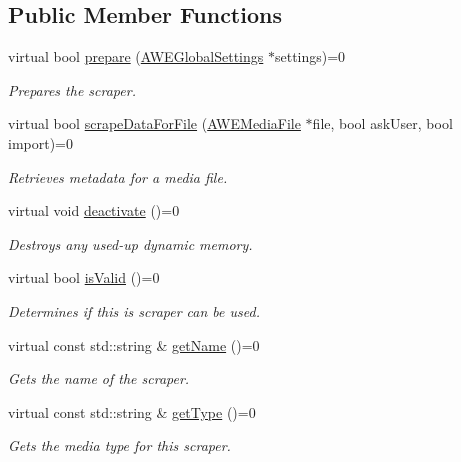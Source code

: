 \subsection*{Public Member Functions}
\begin{DoxyCompactItemize}
\item 
virtual bool \hyperlink{class_a_w_e_metadata_scraper_a7c4612f42582452206dc293f81c6e570}{prepare} (\hyperlink{class_a_w_e_global_settings}{A\-W\-E\-Global\-Settings} $\ast$settings)=0
\begin{DoxyCompactList}\small\item\em Prepares the scraper. \end{DoxyCompactList}\item 
virtual bool \hyperlink{class_a_w_e_metadata_scraper_a6e9431f049dc303983e7a279ed967bea}{scrape\-Data\-For\-File} (\hyperlink{class_a_w_e_media_file}{A\-W\-E\-Media\-File} $\ast$file, bool ask\-User, bool import)=0
\begin{DoxyCompactList}\small\item\em Retrieves metadata for a media file. \end{DoxyCompactList}\item 
virtual void \hyperlink{class_a_w_e_metadata_scraper_ae12f01a080d1817530f6ecc2f2aa1591}{deactivate} ()=0
\begin{DoxyCompactList}\small\item\em Destroys any used-\/up dynamic memory. \end{DoxyCompactList}\item 
virtual bool \hyperlink{class_a_w_e_metadata_scraper_a587917e62c5864567f475a3d153b0ef8}{is\-Valid} ()=0
\begin{DoxyCompactList}\small\item\em Determines if this is scraper can be used. \end{DoxyCompactList}\item 
virtual const std\-::string \& \hyperlink{class_a_w_e_metadata_scraper_a2706a050ea302fbfd3861d2f0963eafd}{get\-Name} ()=0
\begin{DoxyCompactList}\small\item\em Gets the name of the scraper. \end{DoxyCompactList}\item 
virtual const std\-::string \& \hyperlink{class_a_w_e_metadata_scraper_af37c8135b4aec3b31ec5d3c8a06a202d}{get\-Type} ()=0
\begin{DoxyCompactList}\small\item\em Gets the media type for this scraper. \end{DoxyCompactList}\end{DoxyCompactItemize}


